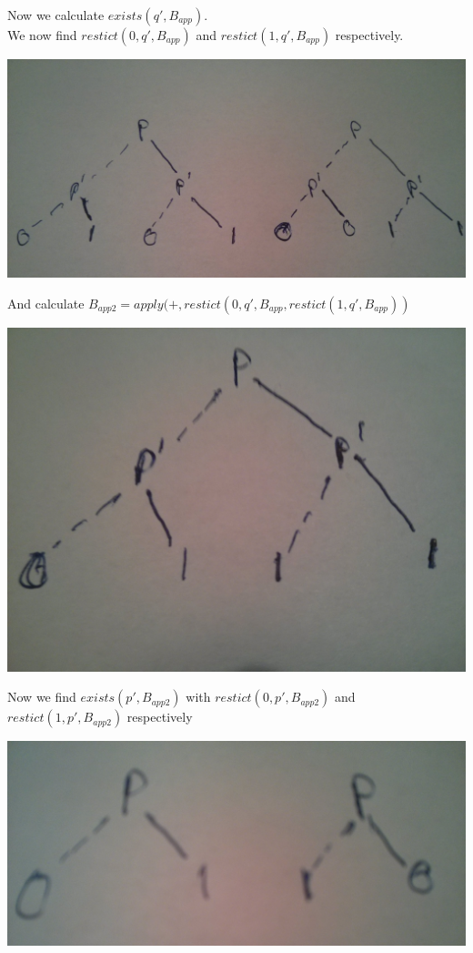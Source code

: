 \documentclass[12pt]{article}
\begin{document}
Now we calculate $exists(q',B_{app})$.\\
We now find $restict(0,q',B_{app})$ and $restict(1,q',B_{app})$ respectively.
\begin{center}
\includegraphics[scale=0.1]{12}
\end{center}
And calculate $B_{app2}=apply(+,restict(0,q',B_{app},restict(1,q',B_{app}))$
\begin{center}
\includegraphics[scale=0.1]{13}
\end{center}
\newpage
Now we find $exists(p',B_{app2})$ with $restict(0,p',B_{app2})$ and $restict(1,p',B_{app2})$ respectively
\begin{center}
\includegraphics[scale=0.1]{14}
\end{center}
\end{document}
